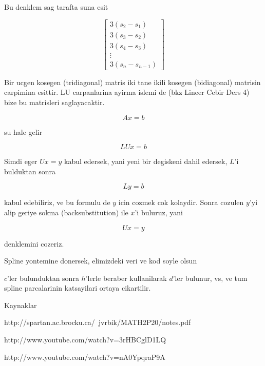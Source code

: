 \documentclass[12pt,fleqn]{article}\usepackage{common}
\begin{document}
Bu denklem sag tarafta suna esit 

\[ 
\left[\begin{array}{r}
3(s_2 - s_1) \\
3(s_3 - s_2) \\
3(s_4 - s_3) \\
\vdots \\
3(s_n - s_{n-1}) 
\end{array}\right]
 \]

Bir ucgen kosegen (tridiagonal) matris iki tane ikili kosegen (bidiagonal)
matrisin carpimina esittir. LU carpanlarina ayirma islemi de (bkz Lineer
Cebir Ders 4) bize bu matrisleri saglayacaktir. 

\[ Ax = b \]

su hale gelir

\[ LUx = b \]

Simdi eger $Ux = y$ kabul edersek, yani yeni bir degiskeni dahil edersek,
$L$'i bulduktan sonra

\[ Ly = b \]

kabul edebiliriz, ve bu formulu de $y$ icin cozmek cok kolaydir. Sonra
cozulen $y$'yi alip geriye sokma (backsubstitution) ile $x$'i buluruz, yani 

\[ Ux = y \]

denklemini cozeriz. 



Spline yontemine donersek, elimizdeki veri ve kod soyle olsun



$c$'ler bulunduktan sonra $h$'lerle beraber kullanilarak $d$'ler bulunur,
vs, ve tum spline parcalarinin katsayilari ortaya cikartilir.

Kaynaklar

http://spartan.ac.brocku.ca/~jvrbik/MATH2P20/notes.pdf

http://www.youtube.com/watch?v=3rHBCglD1LQ

http://www.youtube.com/watch?v=nA0YpqraP9A
\end{document}
